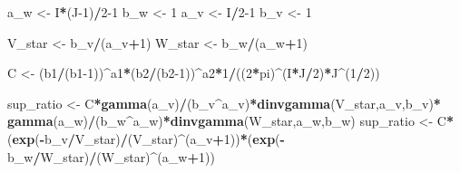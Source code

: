\documentclass[
]{article}
\newenvironment{Shaded}{\begin{snugshade}}{\end{snugshade}}
\newcommand{\DecValTok}[1]{\textcolor[rgb]{0.00,0.00,0.81}{#1}}
\newcommand{\FunctionTok}[1]{\textcolor[rgb]{0.13,0.29,0.53}{\textbf{#1}}}
\newcommand{\NormalTok}[1]{#1}
\newcommand{\OtherTok}[1]{\textcolor[rgb]{0.56,0.35,0.01}{#1}}
\newcommand{\SpecialCharTok}[1]{\textcolor[rgb]{0.81,0.36,0.00}{\textbf{#1}}}
\begin{document}
\begin{Shaded}
\begin{Highlighting}[]
\NormalTok{a\_w }\OtherTok{\textless{}{-}}\NormalTok{ I}\SpecialCharTok{*}\NormalTok{(J}\DecValTok{{-}1}\NormalTok{)}\SpecialCharTok{/}\DecValTok{2{-}1}
\NormalTok{b\_w }\OtherTok{\textless{}{-}} \DecValTok{1}
\NormalTok{a\_v }\OtherTok{\textless{}{-}}\NormalTok{ I}\SpecialCharTok{/}\DecValTok{2{-}1}
\NormalTok{b\_v }\OtherTok{\textless{}{-}} \DecValTok{1}

\NormalTok{V\_star }\OtherTok{\textless{}{-}}\NormalTok{ b\_v}\SpecialCharTok{/}\NormalTok{(a\_v}\SpecialCharTok{+}\DecValTok{1}\NormalTok{)}
\NormalTok{W\_star }\OtherTok{\textless{}{-}}\NormalTok{ b\_w}\SpecialCharTok{/}\NormalTok{(a\_w}\SpecialCharTok{+}\DecValTok{1}\NormalTok{)}

\NormalTok{C }\OtherTok{\textless{}{-}}\NormalTok{ (b1}\SpecialCharTok{/}\NormalTok{(b1}\DecValTok{{-}1}\NormalTok{))}\SpecialCharTok{\^{}}\NormalTok{a1}\SpecialCharTok{*}\NormalTok{(b2}\SpecialCharTok{/}\NormalTok{(b2}\DecValTok{{-}1}\NormalTok{))}\SpecialCharTok{\^{}}\NormalTok{a2}\SpecialCharTok{*}\DecValTok{1}\SpecialCharTok{/}\NormalTok{((}\DecValTok{2}\SpecialCharTok{*}\NormalTok{pi)}\SpecialCharTok{\^{}}\NormalTok{(I}\SpecialCharTok{*}\NormalTok{J}\SpecialCharTok{/}\DecValTok{2}\NormalTok{)}\SpecialCharTok{*}\NormalTok{J}\SpecialCharTok{\^{}}\NormalTok{(}\DecValTok{1}\SpecialCharTok{/}\DecValTok{2}\NormalTok{))}

\NormalTok{sup\_ratio }\OtherTok{\textless{}{-}}\NormalTok{ C}\SpecialCharTok{*}\FunctionTok{gamma}\NormalTok{(a\_v)}\SpecialCharTok{/}\NormalTok{(b\_v}\SpecialCharTok{\^{}}\NormalTok{a\_v)}\SpecialCharTok{*}\FunctionTok{dinvgamma}\NormalTok{(V\_star,a\_v,b\_v)}\SpecialCharTok{*}
  \FunctionTok{gamma}\NormalTok{(a\_w)}\SpecialCharTok{/}\NormalTok{(b\_w}\SpecialCharTok{\^{}}\NormalTok{a\_w)}\SpecialCharTok{*}\FunctionTok{dinvgamma}\NormalTok{(W\_star,a\_w,b\_w)}
\NormalTok{sup\_ratio }\OtherTok{\textless{}{-}}\NormalTok{ C}\SpecialCharTok{*}\NormalTok{(}\FunctionTok{exp}\NormalTok{(}\SpecialCharTok{{-}}\NormalTok{b\_v}\SpecialCharTok{/}\NormalTok{V\_star)}\SpecialCharTok{/}\NormalTok{(V\_star)}\SpecialCharTok{\^{}}\NormalTok{(a\_v}\SpecialCharTok{+}\DecValTok{1}\NormalTok{))}\SpecialCharTok{*}\NormalTok{(}\FunctionTok{exp}\NormalTok{(}\SpecialCharTok{{-}}\NormalTok{b\_w}\SpecialCharTok{/}\NormalTok{W\_star)}\SpecialCharTok{/}\NormalTok{(W\_star)}\SpecialCharTok{\^{}}\NormalTok{(a\_w}\SpecialCharTok{+}\DecValTok{1}\NormalTok{))}
\end{Highlighting}
\end{Shaded}
\end{document}
